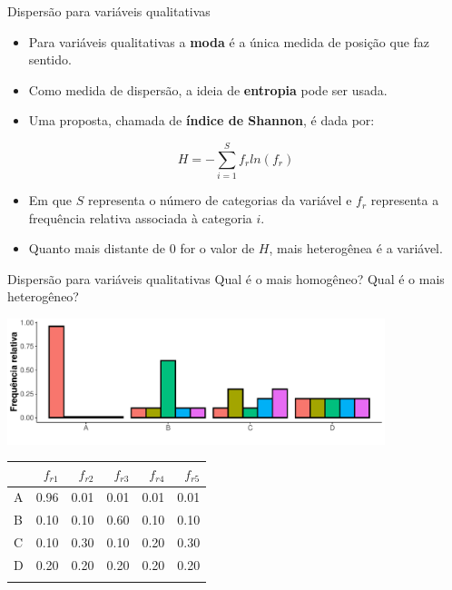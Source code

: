 \documentclass[
  ignorenonframetext,
  serif,
  professionalfont,
  usenames,
  dvipsnames,
  aspectratio = 169]{beamer}
\begin{document}
\begin{frame}{Dispersão para variáveis qualitativas}
\label{dispersuxe3o-para-variuxe1veis-qualitativas}
\begin{itemize}
\item
  Para variáveis qualitativas a \textbf{moda} é a única medida de
  posição que faz sentido.
\item
  Como medida de dispersão, a ideia de \textbf{entropia} pode ser usada.
\item
  Uma proposta, chamada de \textbf{índice de Shannon}, é dada por:
\end{itemize}

\[H = - \sum_{i=1}^{S} f_r ln(f_r)\]

\begin{itemize}
\item
  Em que \(S\) representa o número de categorias da variável e \(f_r\)
  representa a frequência relativa associada à categoria \(i\).
\item
  Quanto mais distante de \(0\) for o valor de \(H\), mais heterogênea é
  a variável.
\end{itemize}
\end{frame}

\begin{frame}{Dispersão para variáveis qualitativas}
\label{dispersuxe3o-para-variuxe1veis-qualitativas-1}
Qual é o mais homogêneo? Qual é o mais heterogêneo?

\begin{center}\includegraphics[width=11cm]{encontro2_files/figure-beamer/unnamed-chunk-18-1} \end{center}

\begin{longtable}[]{@{}lrrrrr@{}}
\toprule\noalign{}
& \(f_{r1}\) & \(f_{r2}\) & \(f_{r3}\) & \(f_{r4}\) & \(f_{r5}\) \\
\midrule\noalign{}
\endhead
A & 0.96 & 0.01 & 0.01 & 0.01 & 0.01 \\
B & 0.10 & 0.10 & 0.60 & 0.10 & 0.10 \\
C & 0.10 & 0.30 & 0.10 & 0.20 & 0.30 \\
D & 0.20 & 0.20 & 0.20 & 0.20 & 0.20 \\
\bottomrule\noalign{}
\end{longtable}
\end{frame}
\end{document}

